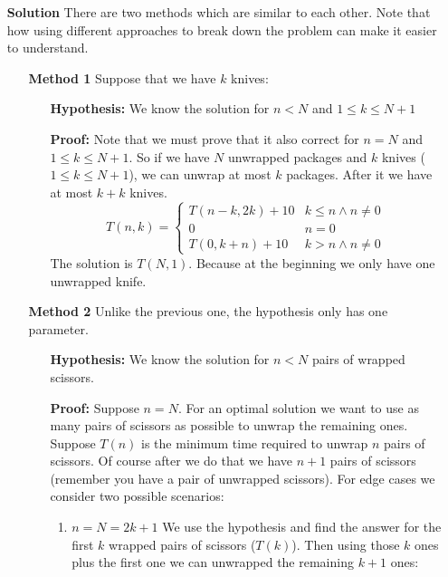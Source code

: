 \documentclass{book}
\begin{document}
	\begin{itemize}
		\item[\textbf{Solution}] There are two methods which are similar to each other. Note that how using different approaches to break down the problem can make it easier to understand.
		\begin{itemize}
			\item[\textbf{Method 1}] Suppose that we have $k$ knives:
			\begin{itemize}
				\item[\textbf{Hypothesis:}] We know the solution for $n < N$ and $1 \le k \le N + 1$
				\item[\textbf{Proof:}] Note that we must prove that it also correct for $n = N$ and $1 \le k \le N + 1$. So if we have $N$ unwrapped packages and $k$ knives ($1 \le k \le N + 1$), we can unwrap at most $k$ packages. After it we have at most $k + k$ knives.
				\begin{equation*}
					T(n, k) = \begin{cases}
						T(n - k, 2k) + 10 & k \le n \land n \ne 0 \\
						0 & n = 0 \\
						T(0, k + n) + 10 & k > n \land n \ne 0
					\end{cases}
				\end{equation*}
                The solution is $T(N, 1)$. Because at the beginning we only have one unwrapped knife.
			\end{itemize}
			\item[\textbf{Method 2}] Unlike the previous one, the hypothesis only has one parameter.
			\begin{itemize}
				\item[\textbf{Hypothesis:}] We know the solution for $n < N$ pairs of wrapped scissors.
				\item[\textbf{Proof:}] Suppose $n = N$. For an optimal solution we want to use as many pairs of scissors as possible to unwrap the remaining ones. Suppose $T(n)$ is the minimum time required to unwrap $n$ pairs of scissors. Of course after we do that we have $n + 1$ pairs of scissors (remember you have a pair of unwrapped scissors). For edge cases we consider two possible scenarios:
				\begin{enumerate}
					\item $n = N = 2k + 1$ We use the hypothesis and find the answer for the first $k$ wrapped pairs of scissors ($T(k)$). Then using those $k$ ones plus the first one we can unwrapped the remaining $k +1$ ones:
					\begin{equation*}

\end{equation*}
\end{enumerate}
\end{itemize}
\end{itemize}
\end{itemize}
\end{document}
